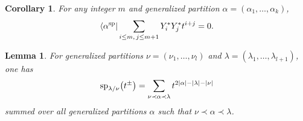 \documentclass[10pt,a4paper]{amsart}
\numberwithin{equation}{section}
\newtheorem{Corollary}[Theorem]{Corollary}
\newtheorem{Lemma}[Theorem]{Lemma}
\begin{document}
\begin{Corollary}\label{cor1}
For any integer $m$ and generalized partition $\alpha=(\alpha_1,\dots,\alpha_k)$,
\begin{align*}
\langle\alpha^{\rm sp}|\sum_{i\leq m,\, j\leq m+1}Y^*_{i}Y^*_{j}t^{i+j}=0.
\end{align*}
\end{Corollary}
\begin{Lemma}\label{le4}
For generalized partitions $\nu=(\nu_{1},\dots,\nu_{l})$ and $\lambda=(\lambda_{1},\dots,\lambda_{l+1})$, one has
\begin{align*}
{\rm sp}_{\lambda/\nu}\big(t^{\pm}\big)=\sum_{\nu\prec\alpha\prec\lambda}t^{2|\alpha|-|\lambda|-|\nu|}
\end{align*}
summed over all generalized partitions $\alpha$ such that $\nu\prec\alpha\prec\lambda$.
\end{Lemma}
\end{document}
